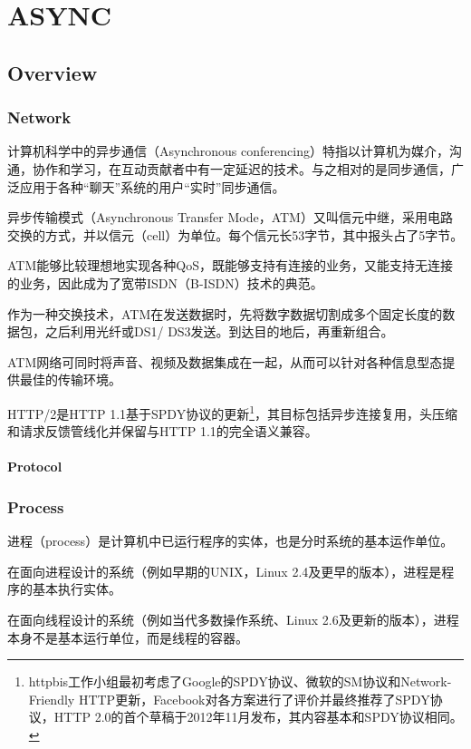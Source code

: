 \part{ASYNC}


\chapter{Overview}


\section{Network}

计算机科学中的异步通信（Asynchronous conferencing）特指以计算机为媒介，沟通，协作和学习，在互动贡献者中有一定延迟的技术。与之相对的是同步通信，广泛应用于各种“聊天”系统的用户“实时”同步通信。


异步传输模式（Asynchronous Transfer Mode，ATM）又叫信元中继，采用电路交换的方式，并以信元（cell）为单位。每个信元长53字节，其中报头占了5字节。

ATM能够比较理想地实现各种QoS，既能够支持有连接的业务，又能支持无连接的业务，因此成为了宽带ISDN（B-ISDN）技术的典范。

作为一种交换技术，ATM在发送数据时，先将数字数据切割成多个固定长度的数据包，之后利用光纤或DS1/ DS3发送。到达目的地后，再重新组合。

ATM网络可同时将声音、视频及数据集成在一起，从而可以针对各种信息型态提供最佳的传输环境。

HTTP/2是HTTP 1.1基于SPDY协议的更新\footnote{httpbis工作小组最初考虑了Google的SPDY协议、微软的SM协议和Network-Friendly HTTP更新，Facebook对各方案进行了评价并最终推荐了SPDY协议，HTTP 2.0的首个草稿于2012年11月发布，其内容基本和SPDY协议相同。}，其目标包括异步连接复用，头压缩和请求反馈管线化并保留与HTTP 1.1的完全语义兼容。


\subsection{Protocol}







\section{Process}


进程（process）是计算机中已运行程序的实体，也是分时系统的基本运作单位。

\begin{compactitem}
\item 在面向进程设计的系统（例如早期的UNIX，Linux 2.4及更早的版本），进程是程序的基本执行实体。
\item 在面向线程设计的系统（例如当代多数操作系统、Linux 2.6及更新的版本），进程本身不是基本运行单位，而是线程的容器。
\end{compactitem}

